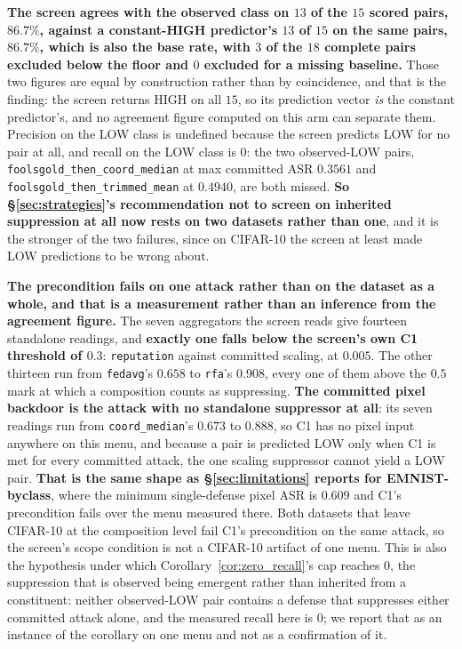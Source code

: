 \documentclass{article}
\begin{document}
\textbf{The screen agrees with the observed class on $13$ of the $15$ scored pairs, $86.7\%$, against a constant-HIGH predictor's $13$ of $15$ on the same pairs, $86.7\%$, which is also the base rate, with $3$ of the $18$ complete pairs excluded below the floor and $0$ excluded for a missing baseline.} Those two figures are equal by construction rather than by coincidence, and that is the finding: the screen returns HIGH on all $15$, so its prediction vector \emph{is} the constant predictor's, and no agreement figure computed on this arm can separate them. Precision on the LOW class is undefined because the screen predicts LOW for no pair at all, and recall on the LOW class is $0$: the two observed-LOW pairs, \texttt{foolsgold\_then\_coord\_median} at max committed ASR $0.3561$ and \texttt{foolsgold\_then\_trimmed\_mean} at $0.4940$, are both missed. \textbf{So §\ref{sec:strategies}'s recommendation not to screen on inherited suppression at all now rests on two datasets rather than one}, and it is the stronger of the two failures, since on CIFAR-10 the screen at least made LOW predictions to be wrong about.

\textbf{The precondition fails on one attack rather than on the dataset as a whole, and that is a measurement rather than an inference from the agreement figure.} The seven aggregators the screen reads give fourteen standalone readings, and \textbf{exactly one falls below the screen's own C1 threshold of $0.3$}: \texttt{reputation} against committed scaling, at $0.005$. The other thirteen run from \texttt{fedavg}'s $0.658$ to \texttt{rfa}'s $0.908$, every one of them above the $0.5$ mark at which a composition counts as suppressing. \textbf{The committed pixel backdoor is the attack with no standalone suppressor at all}: its seven readings run from \texttt{coord\_median}'s $0.673$ to $0.888$, so C1 has no pixel input anywhere on this menu, and because a pair is predicted LOW only when C1 is met for every committed attack, the one scaling suppressor cannot yield a LOW pair. \textbf{That is the same shape as §\ref{sec:limitations} reports for EMNIST-byclass}, where the minimum single-defense pixel ASR is $0.609$ and C1's precondition fails over the menu measured there. Both datasets that leave CIFAR-10 at the composition level fail C1's precondition on the same attack, so the screen's scope condition is not a CIFAR-10 artifact of one menu. This is also the hypothesis under which Corollary~\ref{cor:zero_recall}'s cap reaches $0$, the suppression that is observed being emergent rather than inherited from a constituent: neither observed-LOW pair contains a defense that suppresses either committed attack alone, and the measured recall here is $0$; we report that as an instance of the corollary on one menu and not as a confirmation of it.
\end{document}
